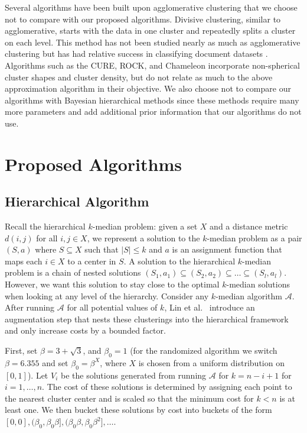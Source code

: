 \documentclass[conference, 10pt, final]{IEEEtran}
\begin{document}
Several algorithms have been built upon agglomerative clustering that we choose not to compare with our proposed algorithms. Divisive clustering, similar to agglomerative, starts with the data in one cluster and repeatedly splits a cluster on each level. This method has not been studied nearly as much as agglomerative clustering \cite{ESL} but has had relative success in classifying document datasets \cite{Zhao}.  Algorithms such as the CURE, ROCK, and Chameleon \cite{Guha_CURE, Guha_ROCK, Karypis} incorporate non-spherical cluster shapes and cluster density, but do not relate as much to the above approximation algorithm in their objective. We also choose not to compare our algorithms with Bayesian hierarchical methods since these methods require many more parameters and add additional prior information that our algorithms do not use. 

\section{Proposed Algorithms}

\subsection{Hierarchical Algorithm} 

Recall the hierarchical $k$-median problem: given a set $X$ and a distance metric $d(i,j)$ for all $i,j \in X$, we represent a solution to the $k$-median problem as a pair $(S, a)$ where $S \subseteq X$ such that $|S| \leq k$ and $a$ is an assignment function that maps each $i \in X$ to a center in $S$.
 A solution to the hierarchical $k$-median problem is a chain of nested solutions $(S_1, a_1) \subseteq (S_2, a_2) \subseteq \ldots \subseteq (S_l, a_l)$. However, we want this solution to stay close to the optimal $k$-median solutions when looking at any level of the hierarchy.  
Consider any $k$-median algorithm $\mathcal{A}$. After running $\mathcal{A}$ for all potential values of $k$, Lin et al.~\cite{Lin} introduce an augmentation step that nests these clusterings into the hierarchical framework and only increase costs by a bounded factor. 

First, set $\beta = 3+\sqrt{3}$, and $\beta_0 = 1$ (for the randomized algorithm we switch $\beta = 6.355$ and set $\beta_0 = \beta^X$, where $X$ is chosen from a uniform distribution on $[0,1]$). Let $V_i$ be the solutions generated from running $\mathcal{A}$ for $k=n-i+1$ for $i=1, \ldots, n$. The cost of these solutions is determined by assigning each point to the nearest cluster center and is scaled so that the minimum cost for $k<n$ is at least one. We then bucket these solutions by cost into buckets of the form $[0,0], (\beta_0, \beta_0 \beta], (\beta_0 \beta, \beta_0 \beta^2], \ldots $. 
\end{document}
